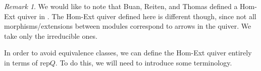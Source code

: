 \documentclass[12pt]{amsart}
\theoremstyle{plain}
\theoremstyle{definition}
\theoremstyle{remark}
\newtheorem{rem}{Remark}[section]
\begin{document}

\begin{rem}
We would like to note that Buan, Reiten, and Thomas defined a Hom-Ext quiver in \cite{buan2011three}. The Hom-Ext quiver defined here is different though, since not all morphisms/extensions between modules correspond to arrows in the quiver. We take only the irreducible ones.
\end{rem}


In order to avoid equivalence classes, we can define the Hom-Ext quiver entirely in terms of rep$Q$. To do this, we will need to introduce some terminology.
\end{document}
